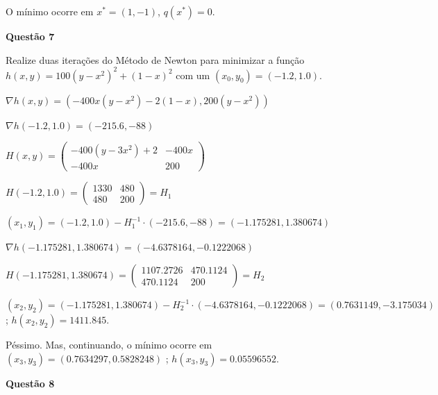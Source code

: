\documentclass{rbfin}
\begin{document}
O mínimo ocorre em $x^* = (1,-1)$, $q(x^*) = 0$.

\singlespacing

\vspace{6mm}

\large

\textbf{Questão 7}

\normalsize

\vspace{6mm}

\doublespacing

Realize duas iterações do Método de Newton para minimizar a função $h(x, y) = 100(y - x^2)^2 +(1 - x)^2$ com um $(x_0, y_0) = (-1.2, 1.0)$.

$\nabla h(x,y) = (-400x(y - x^2) - 2(1 - x), 200(y - x^2))$

$\nabla h(-1.2, 1.0) = (-215.6,-88)$

$H(x,y) = \begin{pmatrix} -400(y - 3x^2) + 2 & -400x  \\ -400x & 200 \end{pmatrix}$

$H(-1.2, 1.0) = \begin{pmatrix} 1330 & 480 \\ 480 & 200 \end{pmatrix} = H_1$

$(x_1, y_1) = (-1.2, 1.0) - H_1^{-1} \cdot (-215.6,-88) = (-1.175281, 1.380674)$

$\nabla h(-1.175281, 1.380674) = (-4.6378164,-0.1222068)$

$H(-1.175281, 1.380674) = \begin{pmatrix} 1107.2726 & 470.1124 \\ 470.1124 & 200 \end{pmatrix} = H_2$

$(x_2, y_2) = (-1.175281, 1.380674) - H_2^{-1} \cdot (-4.6378164,-0.1222068) = (0.7631149, -3.175034)$ ; $h(x_2, y_2) = 1411.845$.

Péssimo. Mas, continuando, o mínimo ocorre em $(x_3, y_3) = (0.7634297, 0.5828248)$ ; $h(x_3, y_3) = 0.05596552$.

\singlespacing

\vspace{6mm}

\large

\textbf{Questão 8}

\normalsize

\vspace{6mm}
\end{document}
